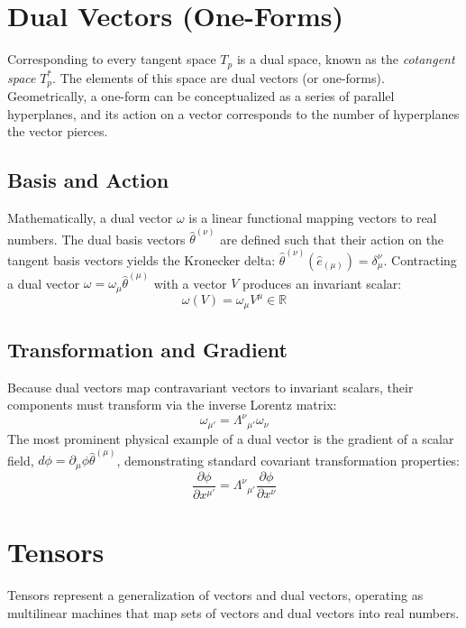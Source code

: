 \documentclass[11pt, a4paper]{report}
\begin{document}
\section{Dual Vectors (One-Forms)}
Corresponding to every tangent space $T_p$ is a dual space, known as the \emph{cotangent space} $T_p^*$. The elements of this space are dual vectors (or one-forms). Geometrically, a one-form can be conceptualized as a series of parallel hyperplanes, and its action on a vector corresponds to the number of hyperplanes the vector pierces. 

\subsection*{Basis and Action}
Mathematically, a dual vector $\omega$ is a linear functional mapping vectors to real numbers. The dual basis vectors $\hat{\theta}^{(\nu)}$ are defined such that their action on the tangent basis vectors yields the Kronecker delta: $\hat{\theta}^{(\nu)}(\hat{e}_{(\mu)}) = \delta^\nu_\mu$. Contracting a dual vector $\omega = \omega_\mu \hat{\theta}^{(\mu)}$ with a vector $V$ produces an invariant scalar:
\begin{equation}
\omega(V) = \omega_\mu V^\mu \in \mathbb{R}
\end{equation}

\subsection*{Transformation and Gradient}
Because dual vectors map contravariant vectors to invariant scalars, their components must transform via the inverse Lorentz matrix:
\begin{equation}
\omega_{\mu'} = {\Lambda^\nu}_{\mu'} \omega_\nu
\end{equation}
The most prominent physical example of a dual vector is the gradient of a scalar field, $d\phi = \partial_\mu \phi \hat{\theta}^{(\mu)}$, demonstrating standard covariant transformation properties:
\begin{equation}
\frac{\partial\phi}{\partial x^{\mu'}} = {\Lambda^\nu}_{\mu'} \frac{\partial\phi}{\partial x^\nu}
\end{equation}

\section{Tensors}
Tensors represent a generalization of vectors and dual vectors, operating as multilinear machines that map sets of vectors and dual vectors into real numbers. 
\end{document}
